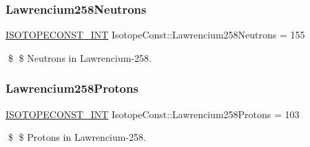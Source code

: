 \subsubsection{\texorpdfstring{Lawrencium258\+Neutrons}{Lawrencium258Neutrons}}
{\footnotesize\ttfamily \mbox{\hyperlink{group___isotope_const-_macros_ga5f18360b3e99483a35c32d789e62621c}{I\+S\+O\+T\+O\+P\+E\+C\+O\+N\+S\+T\+\_\+\+I\+NT}} Isotope\+Const\+::\+Lawrencium258\+Neutrons = 155}

\$ \$ Neutrons in Lawrencium-\/258. \mbox{\label{group___isotope_const-_lawrencium-_lr258_ga26858222b9d1207ae115beaff3a475b7}} 
\subsubsection{\texorpdfstring{Lawrencium258\+Protons}{Lawrencium258Protons}}
{\footnotesize\ttfamily \mbox{\hyperlink{group___isotope_const-_macros_ga5f18360b3e99483a35c32d789e62621c}{I\+S\+O\+T\+O\+P\+E\+C\+O\+N\+S\+T\+\_\+\+I\+NT}} Isotope\+Const\+::\+Lawrencium258\+Protons = 103}

\$ \$ Protons in Lawrencium-\/258. 